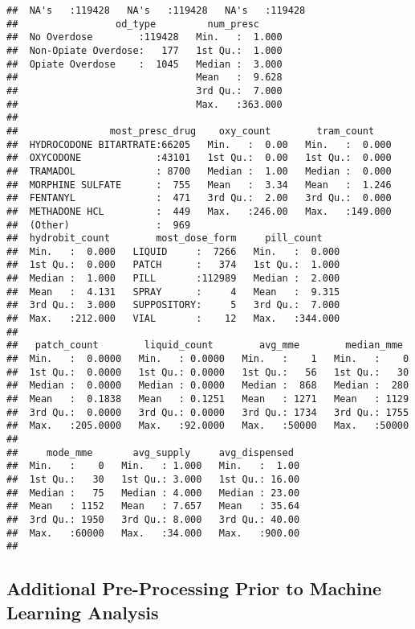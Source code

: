 \documentclass[]{article}
\begin{document}
\begin{verbatim}
##  NA's   :119428   NA's   :119428   NA's   :119428  
##                 od_type         num_presc      
##  No Overdose        :119428   Min.   :  1.000  
##  Non-Opiate Overdose:   177   1st Qu.:  1.000  
##  Opiate Overdose    :  1045   Median :  3.000  
##                               Mean   :  9.628  
##                               3rd Qu.:  7.000  
##                               Max.   :363.000  
##                                                
##                most_presc_drug    oxy_count        tram_count     
##  HYDROCODONE BITARTRATE:66205   Min.   :  0.00   Min.   :  0.000  
##  OXYCODONE             :43101   1st Qu.:  0.00   1st Qu.:  0.000  
##  TRAMADOL              : 8700   Median :  1.00   Median :  0.000  
##  MORPHINE SULFATE      :  755   Mean   :  3.34   Mean   :  1.246  
##  FENTANYL              :  471   3rd Qu.:  2.00   3rd Qu.:  0.000  
##  METHADONE HCL         :  449   Max.   :246.00   Max.   :149.000  
##  (Other)               :  969                                     
##  hydrobit_count        most_dose_form     pill_count     
##  Min.   :  0.000   LIQUID     :  7266   Min.   :  0.000  
##  1st Qu.:  0.000   PATCH      :   374   1st Qu.:  1.000  
##  Median :  1.000   PILL       :112989   Median :  2.000  
##  Mean   :  4.131   SPRAY      :     4   Mean   :  9.315  
##  3rd Qu.:  3.000   SUPPOSITORY:     5   3rd Qu.:  7.000  
##  Max.   :212.000   VIAL       :    12   Max.   :344.000  
##                                                          
##   patch_count        liquid_count        avg_mme        median_mme   
##  Min.   :  0.0000   Min.   : 0.0000   Min.   :    1   Min.   :    0  
##  1st Qu.:  0.0000   1st Qu.: 0.0000   1st Qu.:   56   1st Qu.:   30  
##  Median :  0.0000   Median : 0.0000   Median :  868   Median :  280  
##  Mean   :  0.1838   Mean   : 0.1251   Mean   : 1271   Mean   : 1129  
##  3rd Qu.:  0.0000   3rd Qu.: 0.0000   3rd Qu.: 1734   3rd Qu.: 1755  
##  Max.   :205.0000   Max.   :92.0000   Max.   :50000   Max.   :50000  
##                                                                      
##     mode_mme       avg_supply     avg_dispensed   
##  Min.   :    0   Min.   : 1.000   Min.   :  1.00  
##  1st Qu.:   30   1st Qu.: 3.000   1st Qu.: 16.00  
##  Median :   75   Median : 4.000   Median : 23.00  
##  Mean   : 1152   Mean   : 7.657   Mean   : 35.64  
##  3rd Qu.: 1950   3rd Qu.: 8.000   3rd Qu.: 40.00  
##  Max.   :60000   Max.   :34.000   Max.   :900.00  
## 
\end{verbatim}

\subsection{Additional Pre-Processing Prior to Machine Learning
Analysis}\label{additional-pre-processing-prior-to-machine-learning-analysis}
\end{document}
